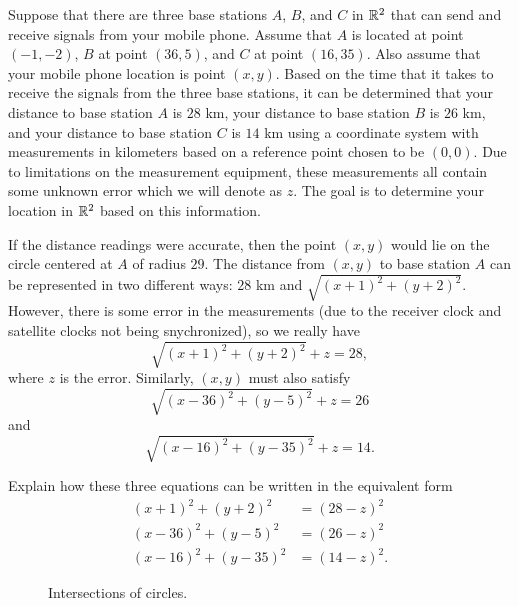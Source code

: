 \begin{pactivity} \label{act:GPS_plane_ex} Suppose that there are three base stations $A$, $B$,  and $C$ in $\mathbb{R}^2$ that can send and receive signals from your mobile phone. Assume that $A$ is located at point $(-1,-2)$, $B$ at point $(36,5)$, and $C$ at point $(16,35)$. Also assume that your mobile phone location is point $(x,y)$. Based on the time that it takes to receive the signals from the three base stations, it can be determined that your distance to base station $A$ is $28$ km, your distance to base station $B$ is $26$ km, and your distance to base station $C$ is $14$ km using a coordinate system with measurements in kilometers based on a reference point chosen to be $(0,0)$. Due to limitations on the measurement equipment, these measurements all contain some unknown error which we will denote as $z$. The goal is to determine your location in $\mathbb{R}^2$ based on this information.

If the distance readings were accurate, then the point $(x,y)$ would lie on the circle centered at $A$ of radius $29$. The distance from $(x,y)$ to base station $A$ can be represented in two different ways: $28$ km and $\sqrt{(x+1)^2 + (y+2)^2}$. However, there is some error in the measurements (due to the receiver clock and satellite clocks not being snychronized), so we really have 
\[\sqrt{(x+1)^2 + (y+2)^2} + z = 28,\]
where $z$ is the error.
Similarly, $(x,y)$ must also satisfy 
\[\sqrt{(x-36)^2 + (y-5)^2} + z = 26\]
and
\[\sqrt{(x-16)^2 + (y-35)^2} + z = 14.\]

\ba
\item Explain how these three equations can be written in the equivalent form
\begin{align}
(x+1)^2+(y+2)^2&=(28-z)^2 \label{eq:GPS_2D_1} \\
(x-36)^2 + (y-5)^2 &= (26-z)^2 \label{eq:GPS_2D_2} \\
(x-16)^2 + (y-35)^2 &= (14-z)^2. \label{eq:GPS_2D_3}
\end{align}


\begin{figure}[h]
\begin{center}
\caption{Intersections of circles.}
\label{F:GPS_circles}
\end{center}
\end{figure}


\end{pactivity}

